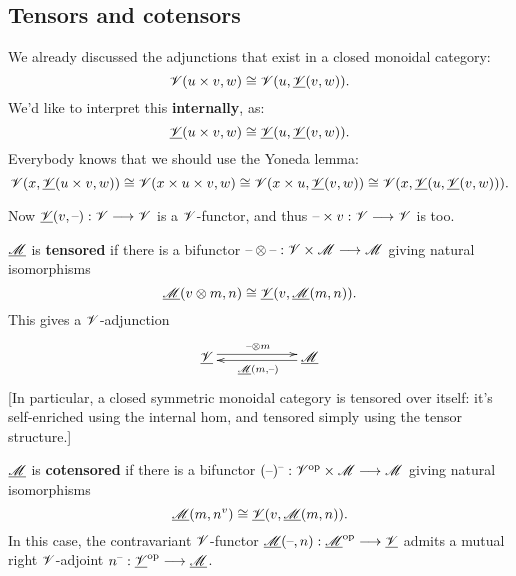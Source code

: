 \documentclass[11pt]{article}
\begin{document}
\begin{4. Basic concepts in enriched category theory}
\subsection*{Tensors and cotensors}
\begin{itemise}
\setlength{\parindent}{.25in}
\item We already discussed the adjunctions that exist in a closed monoidal category:
\[\mathscr{V}(u\times v,w)\cong\mathscr{V}(u,\underline{\mathscr{V}}(v,w)).\]
We'd like to interpret this \textbf{internally}, as:
\[\underline{\mathscr{V}}(u\times v,w)\cong\underline{\mathscr{V}}(u,\underline{\mathscr{V}}(v,w)).\]
Everybody knows that we should use the Yoneda lemma:
\[\mathscr{V}(x,\underline{\mathscr{V}}(u\times v,w))\cong\mathscr{V}(x\times u\times v,w)\cong\mathscr{V}(x\times u,\underline{\mathscr{V}}(v,w))\cong\mathscr{V}(x,\underline{\mathscr{V}}(u,\underline{\mathscr{V}}(v,w))).\]
\item Now $\underline{\mathscr{V}}(v,\textup{--} ):\mathscr{V}\longrightarrow \mathscr{V}$ is a $\mathscr{V}$-functor, and thus $\textup{--} \times v:\mathscr{V}\longrightarrow \mathscr{V}$ is too.
\item $\underline{\mathscr{M}}$ is \textbf{tensored} if there is a bifunctor $\textup{--} \otimes \textup{--} :\mathscr{V}\times \mathscr{M}\longrightarrow\mathscr{M}$ giving natural isomorphisms
\[\underline{\mathscr{M}}(v\otimes m,n)\cong\underline{\mathscr{V}}(v,\underline{\mathscr{M}}(m,n)).\]
This gives a $\mathscr{V}$-adjunction
\[\xymatrix@R=.3cm@C=2cm{
\underline{\scrV}  \ar@<.6ex>[r]^{\DASH \otimes m}&
\underline{\scrM}  \ar@<.4ex>[l]^{\underline{\scrM}(m,\DASH )}\\
}\]
[In particular, a closed symmetric monoidal category is tensored over itself: it's self-enriched using the internal hom, and tensored simply using the tensor structure.]
\item $\underline{\mathscr{M}}$ is \textbf{cotensored} if there is a bifunctor $(\textup{--})^{\textup{--}}  :\mathscr{V}^{\textup{op}}\times \mathscr{M}\longrightarrow\mathscr{M}$ giving natural isomorphisms
\[\underline{\mathscr{M}}(m,n^v)\cong\underline{\mathscr{V}}(v,\underline{\mathscr{M}}(m,n)).\]
In this case, the contravariant $\mathscr{V}$-functor $\underline{\mathscr{M}}(\textup{--} ,n):\underline{\mathscr{M}}^{\textup{op}}\longrightarrow\underline{\mathscr{V}}$ admits a mutual right $\mathscr{V}$-adjoint $n^{\textup{--}} :\underline{\mathscr{V}}^{\textup{op}}\longrightarrow\underline{\mathscr{M}}$.


\end{itemise}
\end{4. Basic concepts in enriched category theory}
\end{document}
